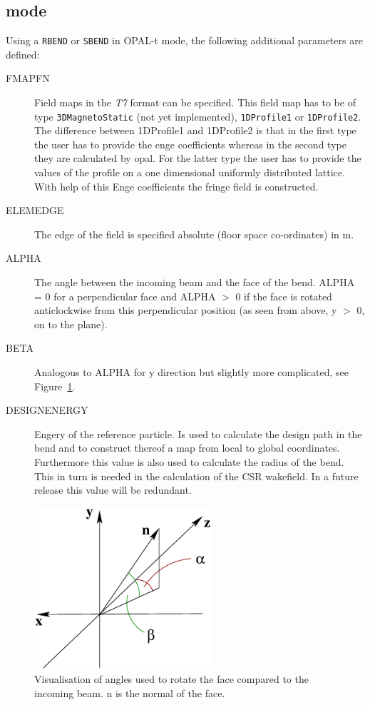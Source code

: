 \subsection{\opalt mode}
\label{sec:opalt:bend}
Using a \texttt{RBEND} or \texttt{SBEND} in OPAL-t mode, the following additional parameters are defined:
\begin{description}
\item[FMAPFN]
  Field maps in the {\em T7} format can be specified. This field map has to be of type \texttt{3DMagnetoStatic}
  (not yet implemented), \texttt{1DProfile1} or \texttt{1DProfile2}. The difference between 1DProfile1 and 1DProfile2
  is that in the first type the user has to provide the enge coefficients whereas in the second type they are
  calculated by opal. For the latter type the user has to provide the values of the profile on a one dimensional
  uniformly distributed lattice. With help of this Enge coefficients the fringe field is constructed.
\item[ELEMEDGE]
  The edge of the field is specified absolute (floor space co-ordinates) in m.
\item[ALPHA]
  The angle between the incoming beam and the face of the bend. ALPHA = 0 for a perpendicular face and ALPHA $>$ 0 if
  the face is rotated anticlockwise from this perpendicular position (as seen from above, y $>$ 0, on to the plane).
\item[BETA]
  Analogous to ALPHA for y direction but slightly more complicated, see Figure~\ref{rbendangle}.
\item[DESIGNENERGY]
  Engery of the reference particle. Is used to calculate the design path in the bend and to construct thereof a map
  from local to global coordinates. Furthermore this value is also used to calculate the radius of the bend. This in
  turn is needed in the calculation of the CSR wakefield. In a future release this value will be redundant.
\end{description}
\begin{figure}
  \begin{center}
  \includegraphics[origin=bl,height=60mm,angle=0]{./figures/rbendangle.pdf}
  \caption{\label{rbendangle}
    Visualisation of angles used to rotate the face compared to the incoming beam. n is the normal of the face.
  }
  \end{center}
%
\end{figure}

